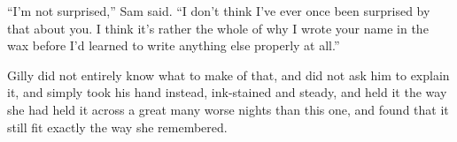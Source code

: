“I’m not surprised,” Sam said. “I don’t think I’ve ever once been surprised by that about you. I think it’s rather the whole of why I wrote your name in the wax before I’d learned to write anything else properly at all.”

Gilly did not entirely know what to make of that, and did not ask him to explain it, and simply took his hand instead, ink-stained and steady, and held it the way she had held it across a great many worse nights than this one, and found that it still fit exactly the way she remembered.